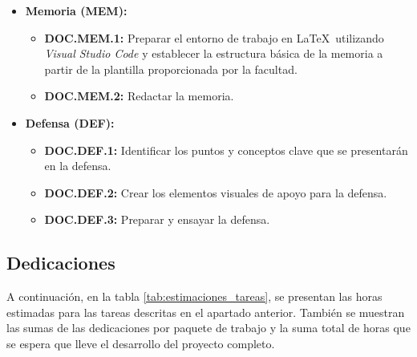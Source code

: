 \begin{itemize}
    \item \textbf{Memoria (MEM):}
          \begin{itemize}
              \item \textbf{DOC.MEM.1:} Preparar el entorno de trabajo en \LaTeX\ utilizando \textit{Visual Studio Code} y establecer la estructura básica de la memoria a partir de la plantilla proporcionada por la facultad.
              \item \textbf{DOC.MEM.2:} Redactar la memoria.
          \end{itemize}
    \item \textbf{Defensa (DEF):}
          \begin{itemize}
              \item \textbf{DOC.DEF.1:} Identificar los puntos y conceptos clave que se presentarán en la defensa.
              \item \textbf{DOC.DEF.2:} Crear los elementos visuales de apoyo para la defensa.
              \item \textbf{DOC.DEF.3:} Preparar y ensayar la defensa.
          \end{itemize}
\end{itemize}

\cleardoublepage

\subsection{Dedicaciones}

A continuación, en la tabla \ref{tab:estimaciones_tareas}, se presentan las horas estimadas para las tareas descritas en el apartado anterior. También se muestran las sumas de las dedicaciones por paquete de trabajo y la suma total de horas que se espera que lleve el desarrollo del proyecto completo.

